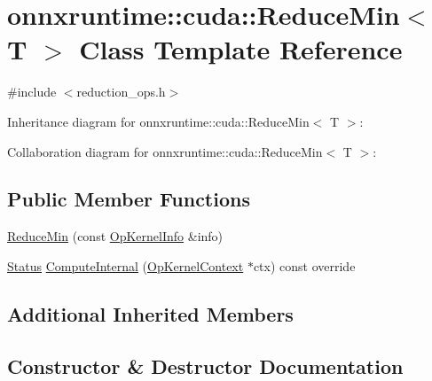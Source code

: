 \hypertarget{classonnxruntime_1_1cuda_1_1ReduceMin}{}\section{onnxruntime\+:\+:cuda\+:\+:Reduce\+Min$<$ T $>$ Class Template Reference}
\label{classonnxruntime_1_1cuda_1_1ReduceMin}


{\ttfamily \#include $<$reduction\+\_\+ops.\+h$>$}



Inheritance diagram for onnxruntime\+:\+:cuda\+:\+:Reduce\+Min$<$ T $>$\+:


Collaboration diagram for onnxruntime\+:\+:cuda\+:\+:Reduce\+Min$<$ T $>$\+:
\subsection*{Public Member Functions}
\begin{DoxyCompactItemize}
\item 
\mbox{\hyperlink{classonnxruntime_1_1cuda_1_1ReduceMin_a2c9c96a69afc36295262c67518d339bb}{Reduce\+Min}} (const \mbox{\hyperlink{classonnxruntime_1_1OpKernelInfo}{Op\+Kernel\+Info}} \&info)
\item 
\mbox{\hyperlink{classonnxruntime_1_1common_1_1Status}{Status}} \mbox{\hyperlink{classonnxruntime_1_1cuda_1_1ReduceMin_a7834ec2b546591eb67744c2a09091fd6}{Compute\+Internal}} (\mbox{\hyperlink{classonnxruntime_1_1OpKernelContext}{Op\+Kernel\+Context}} $\ast$ctx) const override
\end{DoxyCompactItemize}
\subsection*{Additional Inherited Members}


\subsection{Constructor \& Destructor Documentation}
\mbox{\label{classonnxruntime_1_1cuda_1_1ReduceMin_a2c9c96a69afc36295262c67518d339bb}} 
